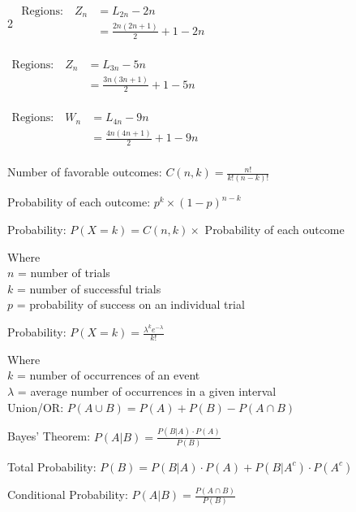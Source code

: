 \begin{multicols}{2}
$\begin{aligned}
\text{Regions:} \quad Z_n &= L_{2n} - 2n\\
       &= \frac{2n(2n+1)}{2} + 1 - 2n \\
\end{aligned}$

$\begin{aligned}
\text{Regions:} \quad Z_n &= L_{3n} - 5n\\
       &= \frac{3n(3n+1)}{2} + 1 - 5n \\
\end{aligned}$

\columnbreak
{}
$\begin{aligned}
\text{Regions:} \quad W_n &= L_{4n} - 9n\\
       &= \frac{4n(4n+1)}{2} + 1 - 9n \\
\end{aligned}$


Number of favorable outcomes: $C(n, k) = \frac{n!}{k!(n-k)!}$

Probability of each outcome: $p^k \times (1-p)^{n-k}$

Probability: $P(X=k) = C(n, k) \times$ Probability of each outcome

Where\\
$n$ = number of trials \\
$k$ = number of successful trials \\
$p$ = probability of success on an individual trial




Probability: $P(X=k) = \frac{\lambda^k e^{-\lambda}}{k!}$

Where\\
$k$ = number of occurrences of an event \\
$\lambda$ = average number of occurrences in a given interval \\




Union/OR: $P(A \cup B) = P(A) + P(B) - P(A\cap B)$

Bayes' Theorem: $P(A|B) = \frac{P(B|A) \cdot P(A)}{P(B)}$

Total Probability: $P(B) = P(B|A) \cdot P(A) + P(B|A^c) \cdot P(A^c)$

Conditional Probability: $P(A|B) = \frac{P(A \cap B)}{P(B)}$


\end{multicols}